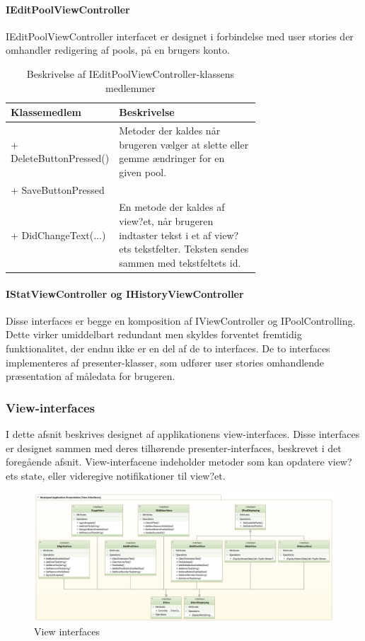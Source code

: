 \paragraph{IEditPoolViewController}
IEditPoolViewController interfacet er designet i forbindelse med user stories der omhandler redigering af pools, på en brugers konto.

\begin{table}
	\centering
	\begin{tabular}{| l | p{0.7\linewidth} |}
		\toprule
		\textbf{Klassemedlem}	& \textbf{Beskrivelse} \\
		\midrule
		+ DeleteButtonPressed()				& Metoder der kaldes når brugeren vælger at slette eller gemme ændringer for en given pool.	\\
		+ SaveButtonPressed				& \\\hline
		+ DidChangeText(...) 					& En metode der kaldes af view?et, når brugeren indtaster tekst i et af view?ets tekstfelter. Teksten sendes  sammen med tekstfeltets id. \\
		\bottomrule
		\end{tabular}
	\caption{Beskrivelse af IEditPoolViewController-klassens medlemmer}
	\label{tab:table_design_ieditpoolviewcontroller}	
\end{table}

\paragraph{IStatViewController og IHistoryViewController}
Disse interfaces er begge en komposition af IViewController og IPoolControlling. Dette virker umiddelbart redundant men skyldes forventet fremtidig funktionalitet, der endnu ikke er en del af de to interfaces. De to interfaces implementeres af presenter-klasser, som udfører user stories omhandlende præsentation af måledata for brugeren.

\subsubsection{View-interfaces}
I dette afsnit beskrives designet af applikationens view-interfaces. Disse interfaces er designet sammen med deres tilhørende presenter-interfaces, beskrevet i det foregående afsnit. View-interfacene indeholder metoder som kan opdatere view?ets state, eller videregive notifikationer til view?et.

\begin{figure}
	\centering
	\includegraphics[width=1.0\linewidth]{figs/design/application_view_interfaces}
	\caption{View interfaces}
	\label{fig:application_view_interfaces}
\end{figure}

